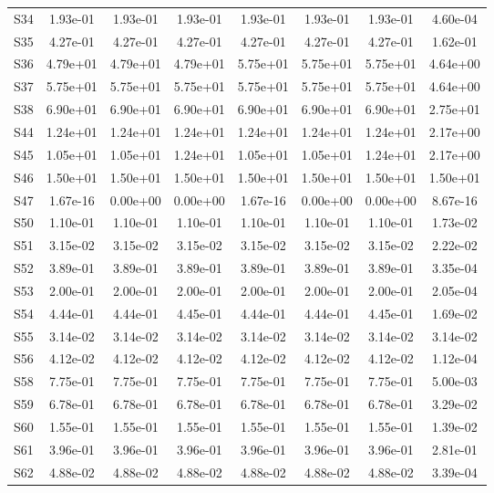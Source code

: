 {\begin{longtable}{l S[table-format=1.2e+2] S[table-format=1.2e+2] S[table-format=1.2e+2] S[table-format=1.2e+2] S[table-format=1.2e+2] S[table-format=1.2e+2] S[table-format=1.2e+2]}
S34 & 1.93e-01 & 1.93e-01 & 1.93e-01 & 1.93e-01 & 1.93e-01 & 1.93e-01 & 4.60e-04 \\
S35 & 4.27e-01 & 4.27e-01 & 4.27e-01 & 4.27e-01 & 4.27e-01 & 4.27e-01 & 1.62e-01 \\
S36 & 4.79e+01 & 4.79e+01 & 4.79e+01 & 5.75e+01 & 5.75e+01 & 5.75e+01 & 4.64e+00 \\
S37 & 5.75e+01 & 5.75e+01 & 5.75e+01 & 5.75e+01 & 5.75e+01 & 5.75e+01 & 4.64e+00 \\
S38 & 6.90e+01 & 6.90e+01 & 6.90e+01 & 6.90e+01 & 6.90e+01 & 6.90e+01 & 2.75e+01 \\
S44 & 1.24e+01 & 1.24e+01 & 1.24e+01 & 1.24e+01 & 1.24e+01 & 1.24e+01 & 2.17e+00 \\
S45 & 1.05e+01 & 1.05e+01 & 1.24e+01 & 1.05e+01 & 1.05e+01 & 1.24e+01 & 2.17e+00 \\
S46 & 1.50e+01 & 1.50e+01 & 1.50e+01 & 1.50e+01 & 1.50e+01 & 1.50e+01 & 1.50e+01 \\
S47 & 1.67e-16 & 0.00e+00 & 0.00e+00 & 1.67e-16 & 0.00e+00 & 0.00e+00 & 8.67e-16 \\
S50 & 1.10e-01 & 1.10e-01 & 1.10e-01 & 1.10e-01 & 1.10e-01 & 1.10e-01 & 1.73e-02 \\
S51 & 3.15e-02 & 3.15e-02 & 3.15e-02 & 3.15e-02 & 3.15e-02 & 3.15e-02 & 2.22e-02 \\
S52 & 3.89e-01 & 3.89e-01 & 3.89e-01 & 3.89e-01 & 3.89e-01 & 3.89e-01 & 3.35e-04 \\
S53 & 2.00e-01 & 2.00e-01 & 2.00e-01 & 2.00e-01 & 2.00e-01 & 2.00e-01 & 2.05e-04 \\
S54 & 4.44e-01 & 4.44e-01 & 4.45e-01 & 4.44e-01 & 4.44e-01 & 4.45e-01 & 1.69e-02 \\
S55 & 3.14e-02 & 3.14e-02 & 3.14e-02 & 3.14e-02 & 3.14e-02 & 3.14e-02 & 3.14e-02 \\
S56 & 4.12e-02 & 4.12e-02 & 4.12e-02 & 4.12e-02 & 4.12e-02 & 4.12e-02 & 1.12e-04 \\
S58 & 7.75e-01 & 7.75e-01 & 7.75e-01 & 7.75e-01 & 7.75e-01 & 7.75e-01 & 5.00e-03 \\
S59 & 6.78e-01 & 6.78e-01 & 6.78e-01 & 6.78e-01 & 6.78e-01 & 6.78e-01 & 3.29e-02 \\
S60 & 1.55e-01 & 1.55e-01 & 1.55e-01 & 1.55e-01 & 1.55e-01 & 1.55e-01 & 1.39e-02 \\
S61 & 3.96e-01 & 3.96e-01 & 3.96e-01 & 3.96e-01 & 3.96e-01 & 3.96e-01 & 2.81e-01 \\
S62 & 4.88e-02 & 4.88e-02 & 4.88e-02 & 4.88e-02 & 4.88e-02 & 4.88e-02 & 3.39e-04 \\

\end{longtable}}

